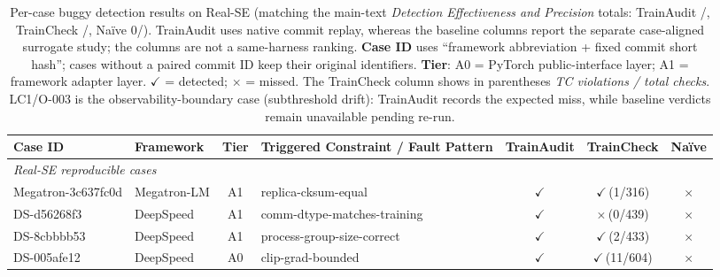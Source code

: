 \documentclass[sigconf,nonacm]{acmart}
\begin{document}
\begin{table}[H]
    \centering
    \setlength{\tabcolsep}{2pt}
    \renewcommand{\arraystretch}{0.95}
    \caption{Per-case buggy detection results on Real-SE (matching the
    main-text \emph{Detection Effectiveness and Precision} totals:
    TrainAudit \NumRealSEDet/\NumRealSE, TrainCheck
    \NumTCDet/\NumBaselineEval, Na\"ive 0/\NumBaselineEval).
    TrainAudit uses native commit replay, whereas the baseline columns report
    the separate case-aligned surrogate study; the columns are not a
    same-harness ranking.
    \textbf{Case ID} uses ``framework abbreviation + fixed commit short hash'';
    cases without a paired commit ID keep their original identifiers.
    \textbf{Tier}: A0 = PyTorch public-interface layer; A1 = framework
    adapter layer. $\checkmark$ = detected; $\times$ = missed. The TrainCheck
    column shows in parentheses \textit{TC violations / total checks}.
    LC1/O-003 is the observability-boundary case (subthreshold drift):
    TrainAudit records the expected miss, while baseline verdicts remain
    unavailable pending re-run.}
    \label{tab:detection-results}
    \small
    \begin{tabularx}{\linewidth}{@{}l l c >{\raggedright\arraybackslash}X >{\centering\arraybackslash}c >{\centering\arraybackslash}c >{\centering\arraybackslash}c@{}}
    \toprule
    \textbf{Case ID} & \textbf{Framework} & \textbf{Tier} & \textbf{Triggered Constraint / Fault Pattern} & \textbf{TrainAudit} & \textbf{TrainCheck} & \textbf{Naïve} \\
    \midrule
    \multicolumn{7}{l}{\textit{Real-SE reproducible cases}} \\
    Megatron-3c637fc0d & Megatron-LM & A1 & replica-cksum-equal                         & $\checkmark$ & $\checkmark$\,(1/316)  & $\times$ \\
    DS-d56268f3        & DeepSpeed   & A1 & comm-dtype-matches-training                  & $\checkmark$ & $\times$\,(0/439)      & $\times$ \\
    DS-8cbbbb53        & DeepSpeed   & A1 & process-group-size-correct                   & $\checkmark$ & $\checkmark$\,(2/433)  & $\times$ \\
    DS-005afe12        & DeepSpeed   & A0 & clip-grad-bounded                            & $\checkmark$ & $\checkmark$\,(11/604) & $\times$ \\

\end{tabularx}
\end{table}
\end{document}
